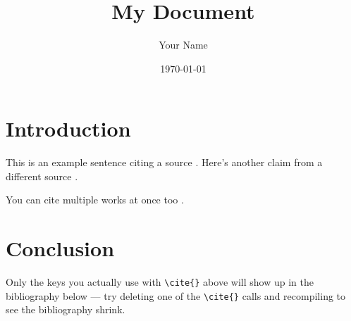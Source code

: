 \documentclass{article}
\title{My Document}
\author{Your Name}
\date{\today}
\begin{document}
\maketitle

\section{Introduction}

This is an example sentence citing a source \parencite{noauthor_61_nodate}.
Here's another claim from a different source \parencite{noauthor_ch_nodate}.

You can cite multiple works at once too \parencite{noauthor_61_nodate, noauthor_ch_nodate}.

\section{Conclusion}

Only the keys you actually use with \texttt{\textbackslash cite\{\}}
above will show up in the bibliography below --- try deleting one
of the \texttt{\textbackslash cite\{\}} calls and recompiling to see
the bibliography shrink.

\printbibliography
\end{document}
